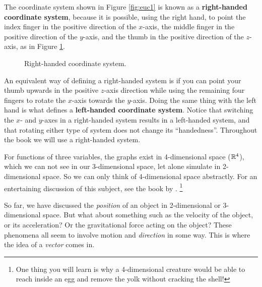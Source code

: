 The coordinate system shown in Figure \ref{fig:euc1} is known as a
\textbf{right-handed coordinate system}, because
it is possible, using the right hand, to point the index finger in the positive direction of the $x$-axis,
the middle finger in the positive direction of the $y$-axis, and the thumb in the positive direction of the
$z$-axis, as in Figure \ref{fig:rhs}.

\begin{figure}[h]
 \begin{center}
  
 \end{center}
 \caption[]{\quad Right-handed coordinate system.}
 \label{fig:rhs}
\end{figure}

An equivalent way of defining a right-handed system is if you can point your thumb upwards in the positive
$z$-axis direction while using the remaining four fingers to rotate the $x$-axis towards the $y$-axis.
Doing the same thing
with the left hand is what defines a \textbf{left-handed coordinate system}.
Notice that switching the $x$- and $y$-axes
in a right-handed system results in a left-handed system, and that rotating either type of system does not change its ``handedness''.  
Throughout the book we will use a right-handed system.

For functions of three variables, the graphs exist in 4-dimensional space ($\mathbb{R}^{4}$),
which we can not see in our 3-dimensional space, let alone simulate in 2-dimensional space.  
So we can only think of 4-dimensional space abstractly.  For an entertaining discussion of this subject, see the book by \cite{abb}.%
\footnote{One thing you will learn is why a 4-dimensional creature would be able to reach inside an egg and remove the yolk without cracking the shell!}

So far, we have discussed the \emph{position} of an object in 2-dimensional or 3-dimensional space.
But what about something such as the velocity of the object, or its acceleration?
Or the gravitational force acting on the object? These phenomena all seem to involve motion and \emph{direction} in some
way.  This is where the idea of a \emph{vector} comes in.

